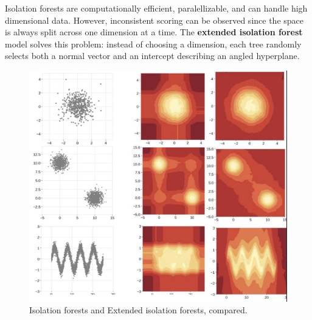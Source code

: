 Isolation forests are computationally efficient, paralellizable, and can handle high dimensional data. However, inconsistent scoring can be observed since the space is always split across one dimension at a time. The \textbf{extended isolation forest} model solves this problem: instead of choosing a dimension, each tree randomly selects both a normal vector and an intercept describing an angled hyperplane.
\clearpage
\begin{figure}[H]
    \centering
    \includegraphics[width=0.5\linewidth]{img/isolation_forests.png}
    \caption{Isolation forests and Extended isolation forests, compared.}
    \label{fig:isolation-forests}
\end{figure}
